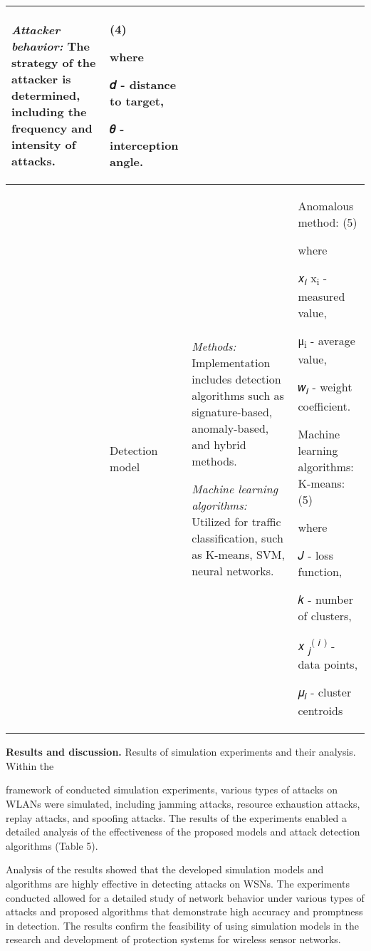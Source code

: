 \begin{longtable}[H]{|@{}
  >{\centering\arraybackslash}p{0.5cm}|
  >{\raggedright\arraybackslash}p{1.5cm}|
  >{\raggedright\arraybackslash}p{}|
  >{\raggedright\arraybackslash}p{}@{}|}
\emph{Attacker behavior:} The strategy of the attacker is determined, including the frequency and intensity of attacks. & (4)

where

𝑑 - distance to target,

𝜃 - interception angle. \\
\hline
4 & Detection model & \emph{Methods:} Implementation includes detection algorithms such as signature-based, anomaly-based, and hybrid methods.

\emph{Machine learning algorithms:} Utilized for traffic classification, such as K-means, SVM, neural networks. & Anomalous method: (5)

where

𝑥\textsubscript{𝑖} x\textsubscript{i} \hspace{0pt} - measured value,

μ\textsubscript{i} \hspace{0pt} - average value,

𝑤\textsubscript{𝑖} \hspace{0pt} - weight coefficient.

Machine learning algorithms: K-means: (5)

where

𝐽 - loss function,

𝑘 - number of clusters,

𝑥 \textsubscript{𝑗}\textsuperscript{( 𝑖 )} \hspace{0pt} - data points,

𝜇\textsubscript{𝑖} \hspace{0pt} - cluster centroids \\
\hline
\end{longtable}

\begin{multicols}{2}
{\bfseries Results and discussion.} Results of simulation experiments and
their analysis. Within the

framework of conducted simulation experiments, various types of attacks
on WLANs were simulated, including jamming attacks, resource exhaustion
attacks, replay attacks, and spoofing attacks. The results of the
experiments enabled a detailed analysis of the effectiveness of the
proposed models and attack detection algorithms (Table 5).

Analysis of the results showed that the developed simulation models and
algorithms are highly effective in detecting attacks on WSNs. The
experiments conducted allowed for a detailed study of network behavior
under various types of attacks and proposed algorithms that demonstrate
high accuracy and promptness in detection. The results confirm the
feasibility of using simulation models in the research and development
of protection systems for wireless sensor networks.
\end{multicols}

